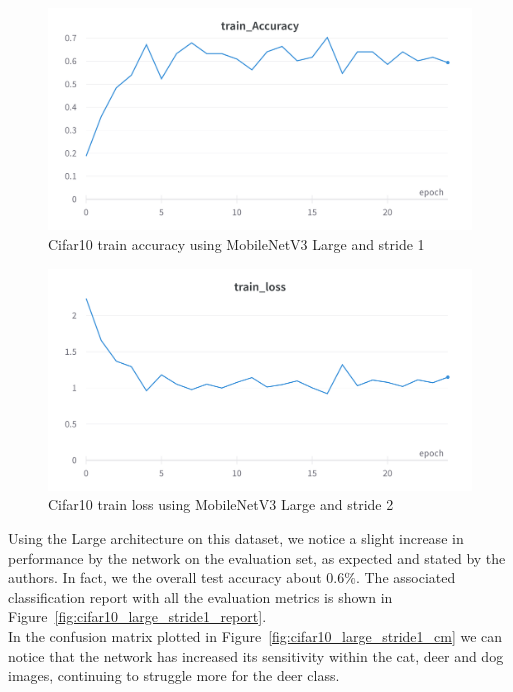 \documentclass[12pt, letterpaper, twoside]{article}
\begin{document}
\begin{figure}[H]
	\centering
	\includegraphics[width=.7\textwidth]{mnet_large_cifar10_accuracy_stride1.png}
	\caption{Cifar10 train accuracy using MobileNetV3 Large and stride 1}
	\label{fig:cifar10_large_stride1_acc}
\end{figure}

\begin{figure}[H]
	\centering
	\includegraphics[width=.7\textwidth]{mnet_large_cifar10_loss_stride1.png}
	\caption{Cifar10 train loss using MobileNetV3 Large and stride 2}
	\label{fig:cifar10_large_stride1_loss}
\end{figure}

Using the Large architecture on this dataset, we notice a slight increase in performance by the network on the evaluation set, as expected and stated by the authors. In fact, we the overall test accuracy about $0.6\%$. The associated classification report with all the evaluation metrics is shown in Figure~\ref{fig:cifar10_large_stride1_report}.\\

In the confusion matrix plotted in Figure~\ref{fig:cifar10_large_stride1_cm} we can notice that the network has increased its sensitivity within the  cat, deer and dog images, continuing to struggle more for the deer class. 
\end{document}
